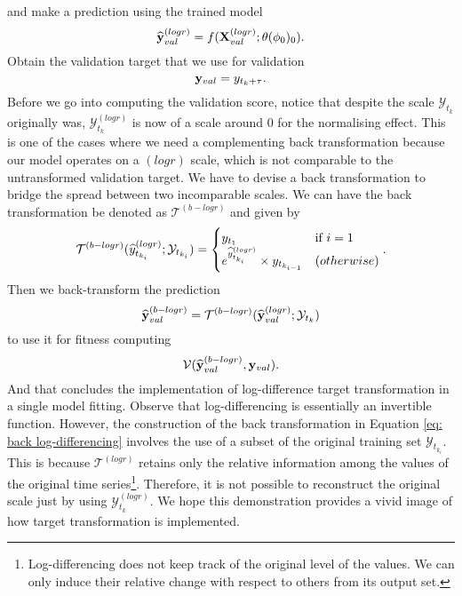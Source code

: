 and make a prediction using the trained model
\begin{equation*}
    \widehat{\mathbf{y}}^{(logr)}_{val} = f(\mathbf{X}^{(logr)}_{val} ; \theta(\phi_0)_0).
\end{equation*}
Obtain the validation target that we use for validation
\begin{equation*}
    \mathbf{y}_{val} = y_{t_k + \tau}.
\end{equation*}
Before we go into computing the validation score, notice that despite the scale $\mathcal{Y}_{t_k}$ originally was, $\mathcal{Y}^{(logr)}_{t_k}$ is now of a scale around $0$ for the normalising effect. This is one of the cases where we need a complementing back transformation because our model operates on a $(logr)$ scale, which is not comparable to the untransformed validation target. We have to devise a back transformation to bridge the spread between two incomparable scales. We can have the back transformation be denoted as $\mathcal{T}^{(b-logr)}$ and given by
\begin{equation}\label{eq: back log-differencing}
    \mathcal{T}^{(b-logr)}(\widehat{y}^{(logr)}_{t_{k_i}} ;\mathcal{Y}_{t_{k_i}}) =
    \begin{cases}
        y_{t_1}                                                   &\text{if $i = 1$} \\
        e^{\widehat{y}^{(logr)}_{t_{k_i}}} \times y_{t_{k_{i-1}}} &\text(otherwise)
    \end{cases}.
\end{equation}
Then we back-transform the prediction
\begin{equation*}
    \widehat{\mathbf{y}}^{(b-logr)}_{val} = \mathcal{T}^{(b-logr)}(\widehat{\mathbf{y}}^{(logr)}_{val} ;\mathcal{Y}_{t_k})
\end{equation*}
to use it for fitness computing
\begin{equation*}
    \mathcal{V}(\widehat{\mathbf{y}}^{(b-logr)}_{val}, \mathbf{y}_{val}).
\end{equation*}
And that concludes the implementation of log-difference target transformation in a single model fitting. Observe that log-differencing is essentially an invertible function. However, the construction of the back transformation in Equation \ref{eq: back log-differencing} involves the use of a subset of the original training set $\mathcal{Y}_{t_{k_i}}$. This is because $\mathcal{T}^{(logr)}$ retains only the relative information among the values of the original time series\footnote{Log-differencing does not keep track of the original level of the values. We can only induce their relative change with respect to others from its output set.}. Therefore, it is not possible to reconstruct the original scale just by using $\mathcal{Y}^{(logr)}_{t_k}$. We hope this demonstration provides a vivid image of how target transformation is implemented.

